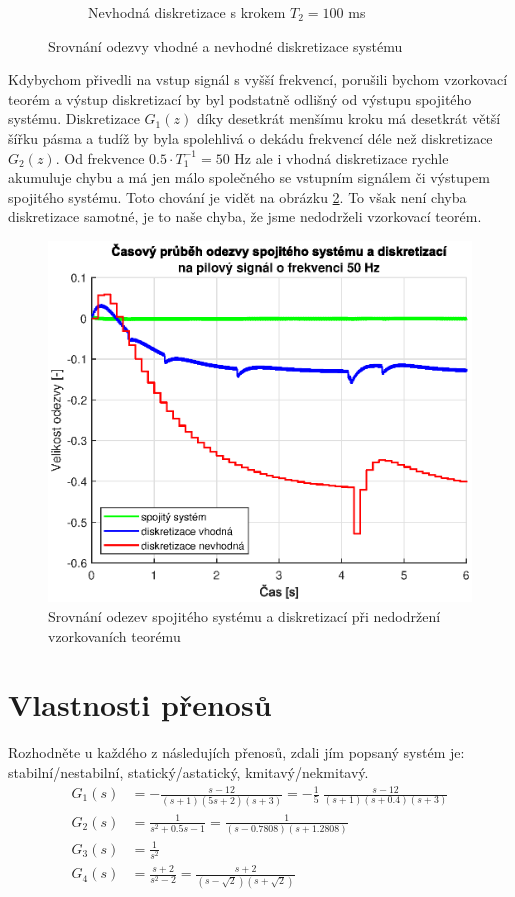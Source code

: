 \documentclass[twoside]{article}
\begin{document}
\begin{figure}[htbp]
\begin{subfigure}{0.45\textwidth}
		\caption{Nevhodná diskretizace s krokem $T_2 = 100$ ms}
	\end{subfigure}
	\caption{Srovnání odezvy vhodné a nevhodné diskretizace systému}
	\label{fig:diskretizace}
\end{figure}


Kdybychom přivedli na vstup signál s vyšší frekvencí, porušili bychom vzorkovací teorém a výstup diskretizací by byl podstatně odlišný od výstupu spojitého systému.
Diskretizace $G_1(z)$ díky desetkrát menšímu kroku má desetkrát větší šířku pásma a tudíž by byla spolehlivá o dekádu frekvencí déle než diskretizace $G_2(z)$.
Od frekvence $0.5 \cdot T_1^{-1} = 50$ Hz ale i vhodná diskretizace rychle akumuluje chybu a má jen málo společného se vstupním signálem či výstupem spojitého systému.
Toto chování je vidět na obrázku \ref{fig:diskretizace-rip}. To však není chyba diskretizace samotné, je to naše chyba, že jsme nedodrželi vzorkovací teorém.
\begin{figure}
	\centering
	\includegraphics{diskretizace-rip.eps}
	\caption{Srovnání odezev spojitého systému a diskretizací při nedodržení vzorkovaních teorému}
	\label{fig:diskretizace-rip}
\end{figure}


\section{Vlastnosti přenosů}
\label{sec:ukol8}
Rozhodněte u každého z následujích přenosů, zdali jím popsaný systém je: stabilní/nestabilní, statický/astatický, kmitavý/nekmitavý.
\begin{equation*}
	\begin{split}
		G_1(s) &= -\frac{s-12}{(s+1)(5s+2)(s+3)} = -\frac{1}{5}~\frac{s-12}{(s+1)(s+0.4)(s+3)} \\
		G_2(s) &= \frac{1}{s^2 + 0.5s - 1} = \frac{1}{(s-0.7808)(s+1.2808)} \\
		G_3(s) &= \frac{1}{s^2} \\
		G_4(s) &= \frac{s+2}{s^2-2} = \frac{s+2}{(s-\sqrt{2})(s+\sqrt{2})}
	\end{split}
\end{equation*}
\end{document}
